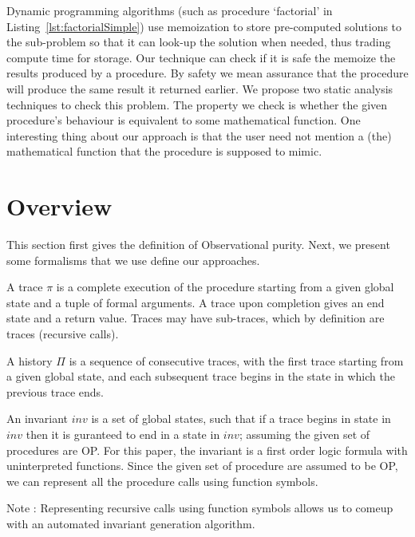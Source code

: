 \documentclass{llncs}
\newcommand{\trace}{\pi}
\newcommand{\inv}{\mathit{inv}}
\newcommand{\history}{\Pi}
\begin{document}
Dynamic programming algorithms (such as procedure `factorial' in
Listing~\ref{lst:factorialSimple}) use memoization to store
pre-computed solutions to the sub-problem so that it can look-up the
solution when needed, thus trading compute time for storage. Our
technique can check if it is safe the memoize the results produced by
a procedure. By safety we mean assurance that the procedure will
produce the same result it returned earlier. We propose two static
analysis techniques to check this problem. The property we check is
whether the given procedure's behaviour is equivalent to some
mathematical function.  One interesting thing about our approach is
that the user need not mention a (the) mathematical function that the
procedure is supposed to mimic.


\section{Overview} \label{sec:overview}
This section first gives the definition of Observational purity. Next,
we present some formalisms that we use define our approaches.

\begin{definition}[trace]
  A trace $\trace$ is a complete execution of the procedure starting from a
  given global state and a tuple of formal arguments. A trace upon
  completion gives an end state and a return value. Traces may have
  sub-traces, which by definition are traces (recursive calls).
\end{definition}

\begin{definition}[history]
  A history $\history$ is a sequence of consecutive traces, with the
  first trace starting from a given global state, and each subsequent
  trace begins in the state in which the previous trace ends.
\end{definition}

\begin{definition}[invariant]
  An invariant $\inv$ is a set of global states, such that if a trace
  begins in state in $\inv$ then it is guranteed to end in a state in
  $\inv$; assuming the given set of procedures are OP. For this paper,
  the invariant is a first order logic formula with uninterpreted
  functions. Since the given set of procedure are assumed to be OP, we
  can represent all the procedure calls using function symbols.
\end{definition}

Note : Representing recursive calls using function symbols allows us
to comeup with an automated invariant generation algorithm.
\end{document}
